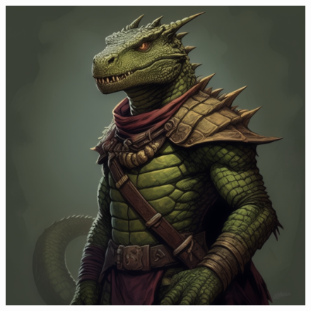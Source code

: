 

\begin{figure}[h]
\begin{center}
\includegraphics[scale=0.24]{img/ai-images/lizardman.png}
\end{center}
\end{figure}
